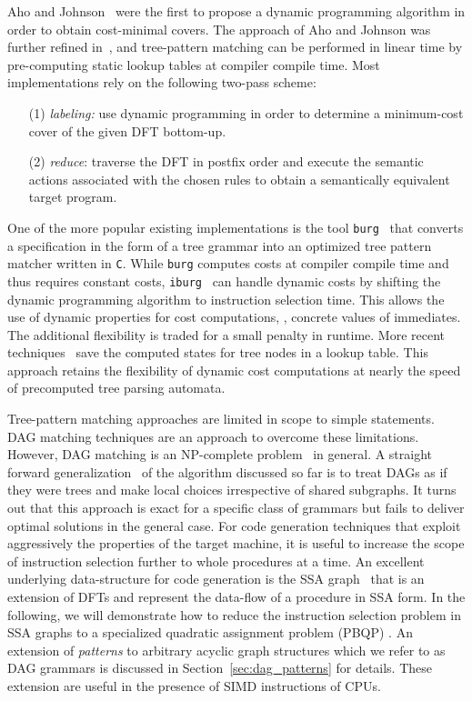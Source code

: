 Aho and Johnson~\cite{aj:76} were the first to propose a dynamic
programming algorithm in order to obtain cost-minimal covers. The
approach of Aho and Johnson was further refined
in~\cite{Balachandran90TreeMatching}, and tree-pattern matching can be
performed in linear time by pre-computing static lookup tables at
compiler compile time. Most implementations rely on the following
two-pass scheme:
\begin{enumerate}
\item[(1)]\emph{labeling:} use dynamic programming in order to
  determine a minimum-cost cover of the given DFT bottom-up.
\item[(2)]\emph{reduce}: traverse the DFT in postfix order and execute
  the semantic actions associated with the chosen rules to obtain a
  semantically equivalent target program.
\end{enumerate}
One of the more popular existing implementations is the tool
\texttt{burg}~\cite{FHP:92} that converts a specification
in the form of a tree grammar into an optimized tree pattern matcher
written in \texttt{C}. While \texttt{burg} computes costs at compiler
compile time and thus requires constant costs,
\texttt{iburg}~\cite{Fraser92Iburg} can handle dynamic costs by
shifting the dynamic programming algorithm to instruction selection
time. This allows the use of dynamic properties for cost computations,
\eg, concrete values of immediates. The additional flexibility is
traded for a small penalty in runtime.  More recent
techniques~\cite{ecg:06} save the computed states for tree nodes in a
lookup table. This approach retains the flexibility of dynamic cost
computations at nearly the speed of precomputed tree parsing automata.

Tree-pattern matching approaches are limited in scope to simple
statements. DAG matching techniques are an approach to overcome these
limitations. However, DAG matching is an NP-complete
problem~\cite{pro98least} in general. A straight forward
generalization~\cite{ertl99optimal} of the algorithm discussed so far
is to treat DAGs as if they were trees and make local choices
irrespective of shared subgraphs. It turns out that this approach is
exact for a specific class of grammars but fails to deliver optimal
solutions in the general case.  For code generation techniques that
exploit aggressively the properties of the target machine, it is
useful to increase the scope of instruction selection further to whole
procedures at a time. An excellent underlying data-structure for code
generation is the SSA graph~\cite{GSW95} that is an extension of DFTs
and represent the data-flow of a procedure in SSA form. In the
following, we will demonstrate how to reduce the instruction selection
problem in SSA graphs to a specialized quadratic assignment problem
(PBQP) \cite{EcksteinKS03}. An extension of \emph{patterns} to
arbitrary acyclic graph structures which we refer to as DAG grammars
is discussed in Section~\ref{sec:dag_patterns} for details. These
extension are useful in the presence of SIMD instructions of CPUs.

